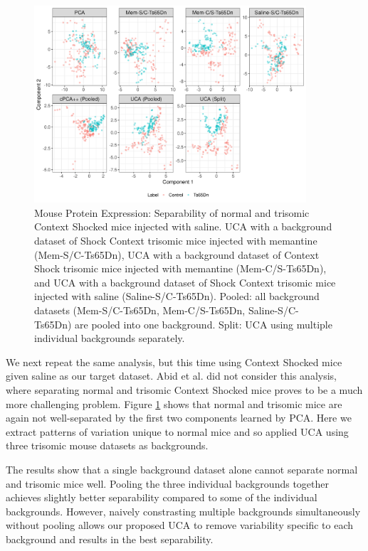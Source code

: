 \documentclass[12pt]{article}
\begin{document}
\begin{figure}[th!]
  \centering
  \includegraphics[width = 0.9\textwidth]{figure/Mouse_split_stack_Ts65Dn.png}
  \caption{Mouse Protein Expression: Separability of normal and trisomic Context Shocked mice injected with saline. UCA with a background dataset of Shock Context trisomic mice injected with memantine (Mem-S/C-Ts65Dn), UCA with a background dataset of Context Shock trisomic mice injected with memantine (Mem-C/S-Ts65Dn), and UCA with a background dataset of Shock Context trisomic mice injected with saline (Saline-S/C-Ts65Dn). Pooled: all background datasets (Mem-S/C-Ts65Dn, Mem-C/S-Ts65Dn, Saline-S/C-Ts65Dn) are pooled into one background. Split: UCA using multiple individual backgrounds separately.}
  \label{fig:MouseSplitStack}
\end{figure}

We next repeat the same analysis, but this time using Context Shocked mice given saline as our target dataset. Abid et al. \cite{Abid} did not consider this analysis, where separating normal and trisomic Context Shocked mice proves to be a much more challenging problem. Figure \ref{fig:MouseSplitStack} shows that normal and trisomic mice are again not well-separated by the first two components learned by PCA.
Here we extract patterns of variation unique to normal mice and so applied UCA using three trisomic mouse datasets as backgrounds.

The results show that a single background dataset alone cannot separate normal and trisomic mice well. Pooling the three individual backgrounds together achieves slightly better separability compared to some of the individual backgrounds. However, naively constrasting multiple backgrounds simultaneously without pooling allows our proposed UCA to remove variability specific to each background and results in the best separability.
\end{document}
